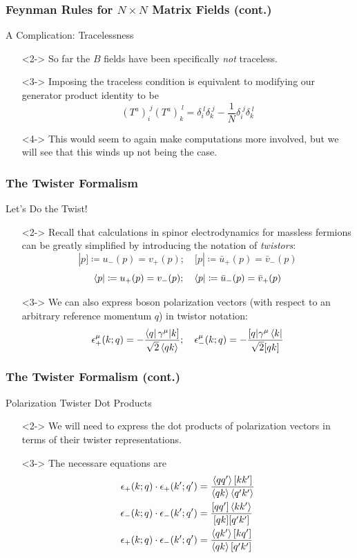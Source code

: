\documentclass{beamer}
\begin{document}
\begin{frame}
    \frametitle{Feynman Rules for $N\times N$ Matrix Fields (cont.)}
    \alert{A Complication: Tracelessness}
    \begin{itemize}
        \item[\textbullet]<2-> So far the $B$ fields have been specifically \textit{not} traceless.
        \item[\textbullet]<3-> Imposing the traceless condition is equivalent to modifying our generator product identity to be \[ (T^a)_i^{\;j}(T^a)_k^{\;l} = \delta_i^{\;l}\delta_k^{\;j} - \frac{1}{N}\delta_i^{\;j}\delta_k^{\;l} \]
        \item[\textbullet]<4-> This would seem to again make computations more involved, but we will see that this winds up not being the case.
    \end{itemize}
\end{frame}

\begin{frame}
    \frametitle{The Twister Formalism}
    \alert{Let's Do the Twist!}
    \begin{itemize}
        \item[\textbullet]<2-> Recall that calculations in spinor electrodynamics for massless fermions can be greatly simplified by introducing the notation of \textit{twistors}:\[ |p] \coloneqq u_-(p) = v_+(p); \quad [p| \coloneqq \bar{u}_+(p) = \bar{v}_-(p) \] \[ \bra{p} \coloneqq u_+(p) = v_-(p); \quad \bra{p} \coloneqq \bar{u}_-(p) = \bar{v}_+(p) \]
        \item[\textbullet]<3-> We can also express boson polarization vectors (with respect to an arbitrary reference momentum $q$) in twistor notation: \[ \epsilon_+^\mu(k;q) = -\frac{\bra{q}\gamma^\mu|k]}{\sqrt{2}\ev{qk}}; \quad \epsilon_-^\mu(k;q) = -\frac{[q|\gamma^\mu\bra{k}}{\sqrt{2}[qk]} \]
    \end{itemize}
\end{frame}

\begin{frame}
    \frametitle{The Twister Formalism (cont.)}
    \alert{Polarization Twister Dot Products}
    \begin{itemize}
        \item[\textbullet]<2-> We will need to express the dot products of polarization vectors in terms of their twister representations.
        \item[\textbullet]<3-> The necessare equations are
        \begin{align*}
            \epsilon_+(k;q)\cdot\epsilon_+(k';q') &= \frac{\ev{qq'}[kk']}{\ev{qk}\ev{q'k'}} \\
            \epsilon_-(k;q)\cdot\epsilon_-(k';q') &= \frac{[qq']\ev{kk'}}{[qk][q'k']} \\
            \epsilon_+(k;q)\cdot\epsilon_-(k';q') &= \frac{\ev{qk'}[kq']}{\ev{qk}[q'k']}
        \end{align*} 
    \end{itemize}
\end{frame}
\end{document}
